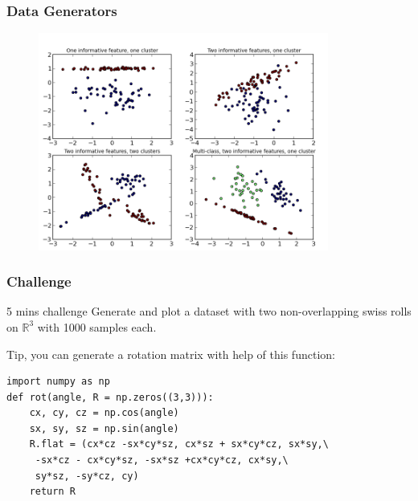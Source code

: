 \documentclass[10pt, colorlinks]{beamer}
\begin{document}
\begin{frame}[fragile]\frametitle{Data Generators}
\begin{figure}[!htb]
    \centering
    \includegraphics[width=0.85\textwidth]{figs/randomdata}
\end{figure}
\end{frame}

\begin{frame}[fragile]\frametitle{Challenge}

\begin{block}{5 mins challenge}
Generate and plot a dataset with two non-overlapping swiss rolls on $\mathbb{R}^3$ with 1000 samples each.  
\end{block}
Tip, you can generate a rotation matrix with help of this function: 

\begin{verbatim}
import numpy as np
def rot(angle, R = np.zeros((3,3))):
    cx, cy, cz = np.cos(angle)
    sx, sy, sz = np.sin(angle)
    R.flat = (cx*cz -sx*cy*sz, cx*sz + sx*cy*cz, sx*sy,\
     -sx*cz - cx*cy*sz, -sx*sz +cx*cy*cz, cx*sy,\
     sy*sz, -sy*cz, cy)
    return R
\end{verbatim}


\end{frame}
\end{document}
